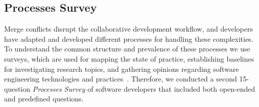 \subsection{Processes Survey}\label{processes_survey}

Merge conflicts disrupt the collaborative development workflow, and developers have adapted and developed different processes for handling these complexities.
To understand the common structure and prevalence of these processes we use surveys, which are used for mapping the state of practice, establishing baselines for investigating research topics, and gathering opinions regarding software engineering technologies and practices~\cite{deMello2016survey}.
Therefore, we conducted a second 15-question \textit{Processes Survey} of software developers that included both open-ended and predefined questions.

